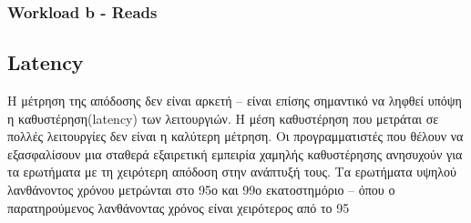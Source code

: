 \documentclass[conference]{IEEEtran}
\begin{document}
\subsubsection{Workload b - Reads}

\subsection{Latency}
Η μέτρηση της απόδοσης δεν είναι αρκετή – είναι επίσης σημαντικό να ληφθεί υπόψη 
η καθυστέρηση(latency) των λειτουργιών. Η μέση καθυστέρηση που μετράται σε πολλές 
λειτουργίες δεν είναι η καλύτερη μέτρηση. Οι προγραμματιστές που θέλουν να 
εξασφαλίσουν μια σταθερά εξαιρετική εμπειρία χαμηλής καθυστέρησης ανησυχούν 
για τα ερωτήματα με τη χειρότερη απόδοση στην ανάπτυξή τους. Τα ερωτήματα 
υψηλού λανθάνοντος χρόνου μετρώνται στο 95ο και 99ο εκατοστημόριο – όπου ο 
παρατηρούμενος λανθάνοντας χρόνος είναι χειρότερος από το 95%
\end{document}
